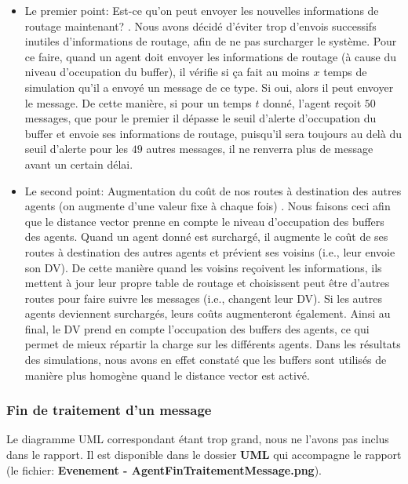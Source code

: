 \documentclass[a4paper,11pt]{article}
\begin{document}
\begin{itemize}
 \item Le premier point: \og Est-ce qu'on peut envoyer les nouvelles informations de routage maintenant? \fg. Nous avons décidé d'éviter trop d'envois successifs inutiles d'informations de routage, afin de ne pas surcharger le système. Pour ce faire, quand un agent doit envoyer les informations de routage (à cause du niveau d'occupation du buffer), il vérifie si ça fait au moins $x$ temps de simulation qu'il a envoyé un message de ce type. Si oui, alors il peut envoyer le message. De cette manière, si pour un temps $t$ donné, l'agent reçoit $50$ messages, que pour le premier il dépasse le seuil d'alerte d'occupation du buffer et envoie ses informations de routage, puisqu'il sera toujours au delà du seuil d'alerte pour les $49$ autres messages, il ne renverra plus de message avant un certain délai.
 
 \item Le second point: \og Augmentation du coût de nos routes à destination des autres agents (on augmente d'une valeur fixe à chaque fois) \fg. Nous faisons ceci afin que le distance vector prenne en compte le niveau d'occupation des buffers des agents. Quand un agent donné est surchargé, il augmente le coût de ses routes à destination des autres agents et prévient ses voisins (i.e., leur envoie son DV). De cette manière quand les voisins reçoivent les informations, ils mettent à jour leur propre table de routage et choisissent peut être d'autres routes pour faire suivre les messages (i.e., changent leur DV). Si les autres agents deviennent surchargés, leurs coûts augmenteront également. Ainsi au final, le DV prend en compte l'occupation des buffers des agents, ce qui permet de mieux répartir la charge sur les différents agents. Dans les résultats des simulations, nous avons en effet constaté que les buffers sont utilisés de manière plus homogène quand le distance vector est activé.
\end{itemize}





\subsubsection{Fin de traitement d'un message}
Le diagramme UML correspondant étant trop grand, nous ne l'avons pas inclus dans le rapport. Il est disponible dans le dossier \textbf{UML} qui accompagne le rapport (le fichier: \textbf{Evenement - AgentFinTraitementMessage.png}).
\end{document}
